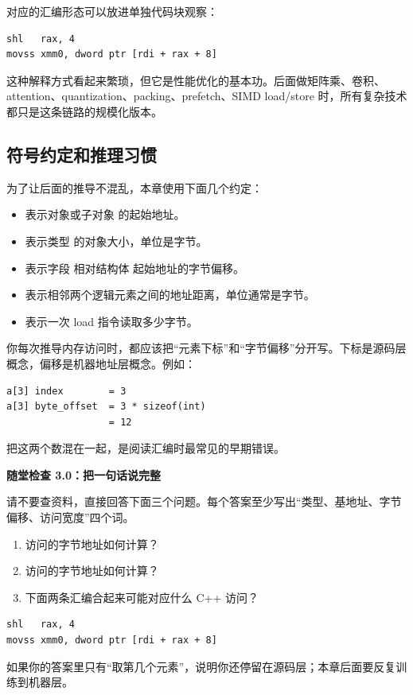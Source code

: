 对应的汇编形态可以放进单独代码块观察：

\begin{lstlisting}
shl   rax, 4
movss xmm0, dword ptr [rdi + rax + 8]
\end{lstlisting}

这种解释方式看起来繁琐，但它是性能优化的基本功。后面做矩阵乘、卷积、attention、quantization、packing、prefetch、SIMD load/store 时，所有复杂技术都只是这条链路的规模化版本。

\subsection{符号约定和推理习惯}

为了让后面的推导不混乱，本章使用下面几个约定：

\begin{itemize}
  \item {} 表示对象或子对象  的起始地址。
  \item {} 表示类型  的对象大小，单位是字节。
  \item {} 表示字段  相对结构体  起始地址的字节偏移。
  \item {} 表示相邻两个逻辑元素之间的地址距离，单位通常是字节。
  \item {} 表示一次 load 指令读取多少字节。
\end{itemize}

你每次推导内存访问时，都应该把“元素下标”和“字节偏移”分开写。下标是源码层概念，偏移是机器地址层概念。例如：

\begin{lstlisting}
a[3] index        = 3
a[3] byte_offset  = 3 * sizeof(int)
                  = 12
\end{lstlisting}

把这两个数混在一起，是阅读汇编时最常见的早期错误。

\begin{exercisebox}
\textbf{随堂检查 3.0：把一句话说完整}

请不要查资料，直接回答下面三个问题。每个答案至少写出“类型、基地址、字节偏移、访问宽度”四个词。

\begin{enumerate}
  \item {} 访问的字节地址如何计算？
  \item {} 访问的字节地址如何计算？
  \item 下面两条汇编合起来可能对应什么 C++ 访问？
\end{enumerate}

\begin{lstlisting}
shl   rax, 4
movss xmm0, dword ptr [rdi + rax + 8]
\end{lstlisting}

如果你的答案里只有“取第几个元素”，说明你还停留在源码层；本章后面要反复训练到机器层。
\end{exercisebox}

